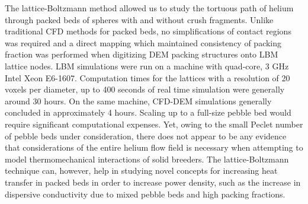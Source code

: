 The lattice-Boltzmann method allowed us to study the tortuous path of helium through packed beds of spheres with and without crush fragments. Unlike traditional CFD methods for packed beds, no simplifications of contact regions was required and a direct mapping which maintained consistency of packing fraction was performed when digitizing DEM packing structures onto LBM lattice nodes. LBM simulations were run on a machine with quad-core, 3 GHz Intel Xeon E6-1607. Computation times for the lattices with a resolution of 20 voxels per diameter, up to 400 seconds of real time simulation were generally around 30 hours. On the same machine, CFD-DEM simulations generally concluded in approximately 4 hours. Scaling up to a full-size pebble bed would require significant computational expenses. Yet, owing to the small Peclet number of pebble beds under consideration, there does not appear to be any evidence that considerations of the entire helium flow field is necessary when attempting to model thermomechanical interactions of solid breeders. The lattice-Boltzmann technique can, however, help in studying novel concepts for increasing heat transfer in packed beds in order to increase power density, such as the increase in dispersive conductivity due to mixed pebble beds and high packing fractions.